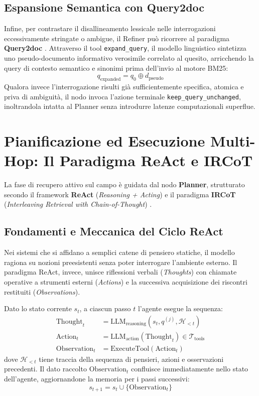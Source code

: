 \subsection{Espansione Semantica con Query2doc}
Infine, per contrastare il disallineamento lessicale nelle interrogazioni eccessivamente stringate o ambigue, il Refiner può ricorrere al paradigma \textbf{Query2doc} \cite{wang2023query2doc}. Attraverso il tool \texttt{expand\_query}, il modello linguistico sintetizza uno pseudo-documento informativo verosimile correlato al quesito, arricchendo la query di contesto semantico e sinonimi prima dell'invio al motore BM25:
\begin{equation}
q_{\text{expanded}} = q_0 \oplus d_{\text{pseudo}}
\end{equation}
Qualora invece l'interrogazione risulti già sufficientemente specifica, atomica e priva di ambiguità, il nodo invoca l'azione terminale \texttt{keep\_query\_unchanged}, inoltrandola intatta al Planner senza introdurre latenze computazionali superflue.

\section{Pianificazione ed Esecuzione Multi-Hop: Il Paradigma ReAct e IRCoT}
\label{sec:planner_react}

La fase di recupero attivo sul campo è guidata dal nodo \textbf{Planner}, strutturato secondo il framework \textbf{ReAct} (\textit{Reasoning + Acting}) \cite{yao2022react} e il paradigma \textbf{IRCoT} (\textit{Interleaving Retrieval with Chain-of-Thought}) \cite{trivedi2023ircot}.

\subsection{Fondamenti e Meccanica del Ciclo ReAct}
Nei sistemi che si affidano a semplici catene di pensiero statiche, il modello ragiona su nozioni preesistenti senza poter interrogare l'ambiente esterno. Il paradigma ReAct, invece, unisce riflessioni verbali (\textit{Thoughts}) con chiamate operative a strumenti esterni (\textit{Actions}) e la successiva acquisizione dei riscontri restituiti (\textit{Observations}).

Dato lo stato corrente $s_t$, a ciascun passo $t$ l'agente esegue la sequenza:
\begin{align}
\text{Thought}_t &= \text{LLM}_{\text{reasoning}}(s_t, q^{(j)}, \mathcal{H}_{<t}) \label{eq:react_thought} \\
\text{Action}_t &= \text{LLM}_{\text{action}}(\text{Thought}_t) \in \mathcal{T}_{\text{tools}} \label{eq:react_action} \\
\text{Observation}_t &= \text{ExecuteTool}(\text{Action}_t) \label{eq:react_obs}
\end{align}
dove $\mathcal{H}_{<t}$ tiene traccia della sequenza di pensieri, azioni e osservazioni precedenti. Il dato raccolto $\text{Observation}_t$ confluisce immediatamente nello stato dell'agente, aggiornandone la memoria per i passi successivi:
\begin{equation}
s_{t+1} = s_t \cup \{\text{Observation}_t\}
\end{equation}

